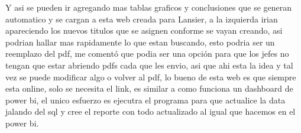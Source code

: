 \documentclass[
]{article}
\begin{document}
Y asi se pueden ir agregando mas tablas graficos y conclusiones que se
generan automatico y se cargan a esta web creada para Lansier, a la
izquierda irian apareciendo los nuevos titulos que se asignen conforme
se vayan creando, asi podrian hallar mas rapidamente lo que estan
buscando, esto podria ser un reemplazo del pdf, me comentó que podia ser
una opción para que los jefes no tengan que estar abriendo pdfs cada que
les envio, asi que ahi esta la idea y tal vez se puede modificar algo o
volver al pdf, lo bueno de esta web es que siempre esta online, solo se
necesita el link, es similar a como funciona un dashboard de power bi,
el unico esfuerzo es ejecutra el programa para que actualice la data
jalando del sql y cree el reporte con todo actualizado al igual que
hacemos en el power bi.
\end{document}
